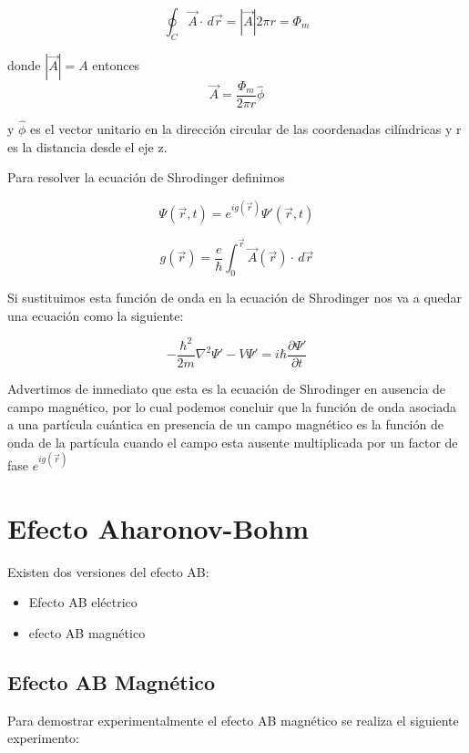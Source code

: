 \documentclass[12pt]{article}
\begin{document}
\begin{equation}
\oint_C \vec{A}\cdot \,d\vec{r}=|\vec{A}|2\pi r=\Phi_m
\end{equation}

donde $|\vec{A}|=A$ entonces 
\begin{equation}
\vec{A}=\frac{\Phi_m}{2\pi r}\hat{\phi}
\end{equation}


y $\hat{\phi}$ es el vector unitario en la dirección circular de las coordenadas cilíndricas y r es la distancia desde el eje z.

Para resolver la ecuación de Shrodinger definimos 


\begin{equation}
\Psi(\vec{r},t)=e^{ig(\vec{r})}\Psi'(\vec{r},t)
\end{equation}

\begin{equation}
g(\vec{r})=\frac{e}{\hbar}\int_{0}^{\vec{r}} \vec{A}(\vec{r})\cdot \,d\vec{r}
\end{equation}


Si sustituimos esta función de onda en la ecuación de Shrodinger nos va a quedar una ecuación como la siguiente:

\begin{equation}
-\frac{\hbar^2}{2m}\nabla^2\Psi'-V\Psi'=i\hbar\frac{\partial \Psi'}{\partial t}
\end{equation}


Advertimos de inmediato que esta es la ecuación de Shrodinger en ausencia de campo magnético, por lo cual podemos concluir que la función de onda asociada a una partícula cuántica en presencia de un campo magnético es la función de onda de la partícula cuando el campo esta ausente multiplicada por un factor de fase $e^{ig(\vec{r})}$

\section{Efecto Aharonov-Bohm}
Existen dos versiones del efecto AB: 
\begin{itemize}
\item Efecto AB eléctrico
\item efecto AB magnético
\end{itemize}

\subsection{Efecto AB Magnético}
Para demostrar experimentalmente el efecto AB magnético se realiza el siguiente experimento:
\end{document}
